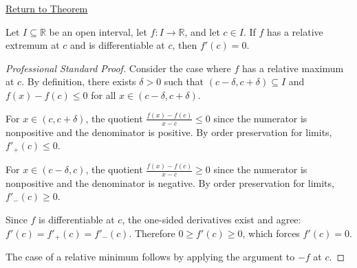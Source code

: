 \newpage
{}
\label{prf:interior-extremum-theorem}

\begin{remark*}[Return]
\hyperref[thm:interior-extremum-theorem]{Return to Theorem}
\end{remark*}

\begin{theorem*}
Let $I \subseteq \mathbb{R}$ be an open interval, let $f : I \to \mathbb{R}$, and let $c \in I$. If $f$ has a relative extremum at $c$ and is differentiable at $c$, then $f'(c) = 0$.
\end{theorem*}

\begin{proof}[Professional Standard Proof]
\LRAProofBodyStart
Consider the case where $f$ has a relative maximum at $c$. By definition, there exists $\delta > 0$ such that $(c - \delta, c + \delta) \subseteq I$ and $f(x) - f(c) \leq 0$ for all $x \in (c - \delta, c + \delta)$.

For $x \in (c, c + \delta)$, the quotient $\frac{f(x) - f(c)}{x - c} \leq 0$ since the numerator is nonpositive and the denominator is positive. By order preservation for limits, $f'_+(c) \leq 0$.

For $x \in (c - \delta, c)$, the quotient $\frac{f(x) - f(c)}{x - c} \geq 0$ since the numerator is nonpositive and the denominator is negative. By order preservation for limits, $f'_-(c) \geq 0$.

Since $f$ is differentiable at $c$, the one-sided derivatives exist and agree: $f'(c) = f'_+(c) = f'_-(c)$. Therefore $0 \geq f'(c) \geq 0$, which forces $f'(c) = 0$.

The case of a relative minimum follows by applying the argument to $-f$ at $c$.
\end{proof}

